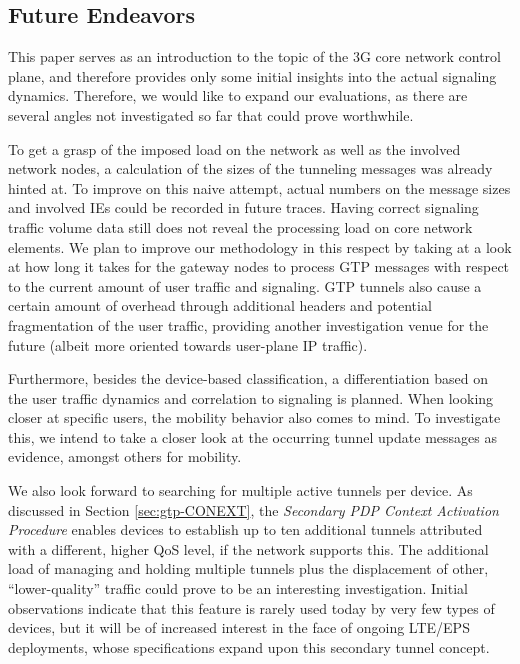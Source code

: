 \subsection{Future Endeavors}

This paper serves as an introduction to the topic of the 3G core network control plane, and therefore provides only some initial insights into the actual signaling dynamics. Therefore, we would like to expand our evaluations, as there are several  angles not investigated so far that could prove worthwhile.

To get a grasp of the imposed load on the network as well as the involved network nodes, a calculation of the sizes of the tunneling messages was already hinted at. To improve on this naive attempt, actual numbers on the message sizes and involved \acp{IE} could be recorded in future traces. Having correct signaling traffic volume data still does not reveal the processing load on core network elements. We plan to improve our methodology in this respect by taking at a look at how long it takes for the gateway nodes to process \ac{GTP} messages with respect to the current amount of user traffic and signaling. \ac{GTP} tunnels also cause a certain amount of overhead through additional headers and potential fragmentation of the user traffic, providing another investigation venue for the future (albeit more oriented towards user-plane IP traffic). 

Furthermore, besides the device-based classification, a differentiation based on the user traffic dynamics and correlation to signaling is planned. When looking closer at specific users, the mobility behavior also comes to mind. To investigate this, we intend to take a closer look at the occurring tunnel update messages as evidence, amongst others for mobility.

We also look forward to searching for multiple active tunnels per device. As discussed in Section \ref{sec:gtp-CONEXT}, the \textit{Secondary PDP Context Activation Procedure} enables devices to establish up to ten additional tunnels attributed with a different, higher QoS level, if the network supports this. The additional load of managing and holding multiple tunnels plus the displacement of other, ``lower-quality'' traffic could prove to be an interesting investigation. Initial observations indicate that this feature is rarely used today by very few types of devices, but it will be of increased interest in the face of ongoing LTE/EPS deployments, whose specifications expand upon this secondary tunnel concept.

